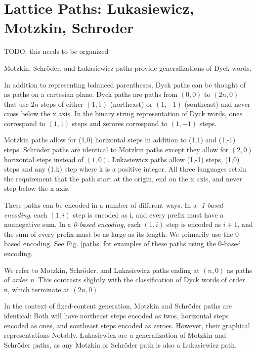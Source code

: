 \chapter{Lattice Paths: Lukasiewicz, Motzkin, Schroder}
TODO: this needs to be organized

Motzkin, Schröder, and Łukasiewicz paths provide generalizations of Dyck words.  

In addition to representing balanced parentheses, Dyck paths can be thought of as paths on a cartesian plane.  Dyck paths are paths from $(0,0)$ to $(2n,0)$ that use $2n$ steps of either $(1,1)$ (northeast) or $(1,-1)$ (southeast) and never cross below the x axis. In the binary string representation of Dyck words, ones correspond to $(1,1)$ steps and zerores correspond to $(1,-1)$ steps.

Motzkin paths allow for (1,0) horizontal steps in addition to (1,1) and (1,-1) steps. Schröder paths are identical to Motzkin paths except they allow for $(2,0)$ horizontal steps instead of $(1,0)$.  Łukasiewicz paths allow (1,-1) steps, (1,0) steps and any (1,k) step where k is a positive integer.  All three languages retain the requirement that the path start at the origin, end on the x axis, and never step below the x axis. 

These paths can be encoded in a number of different ways.  In a \emph{-1-based encoding}, each $(1,i)$ step is encoded as i, and every prefix must have a nonnegative sum.  In a \emph{0-based encoding}, each $(1,i)$ step is encoded as $i+1$, and the sum of every prefix must be as large as its length. We primarily use the 0-based encoding. See Fig. \ref{paths}  for examples of these paths using the 0-based encoding.

We refer to Motzkin, Schröder, and Lukasiewicz paths ending at $(n,0)$ as paths of \emph{order n}.  This contrasts slightly with the classification of Dyck words of order n, which terminate at $(2n,0)$

In the context of fixed-content generation, Motzkin and Schröder paths are identical:  Both will have northeast steps encoded as twos, horizontal steps encoded as ones, and southeast steps encoded as zeroes.  However, their graphical representations Notably, Łukasiewicz are a generalization of Motzkin and Schröder paths, as any Motzkin or Schröder path is also a Lukasiewicz path.

\bigskip

